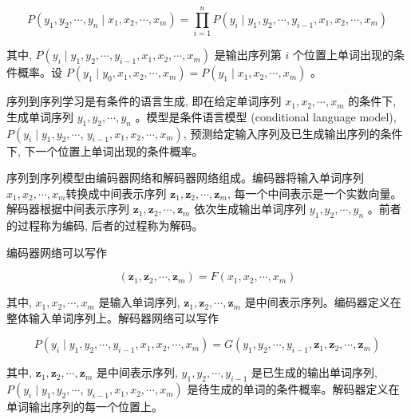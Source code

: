 \documentclass[10pt]{article}
\begin{document}
\begin{equation*}
P\left(y_{1}, y_{2}, \cdots, y_{n} \mid x_{1}, x_{2}, \cdots, x_{m}\right)=\prod_{i=1}^{n} P\left(y_{i} \mid y_{1}, y_{2}, \cdots, y_{i-1}, x_{1}, x_{2}, \cdots, x_{m}\right) \tag{26.1}
\end{equation*}


其中, $P\left(y_{i} \mid y_{1}, y_{2}, \cdots, y_{i-1}, x_{1}, x_{2}, \cdots, x_{m}\right)$ 是输出序列第 $i$ 个位置上单词出现的条件概率。设 $P\left(y_{1} \mid y_{0}, x_{1}, x_{2}, \cdots, x_{m}\right)=P\left(y_{1} \mid x_{1}, x_{2}, \cdots, x_{m}\right)$ 。

序列到序列学习是有条件的语言生成, 即在给定单词序列 $x_{1}, x_{2}, \cdots, x_{m}$ 的条件下, 生成单词序列 $y_{1}, y_{2}, \cdots, y_{n}$ 。模型是条件语言模型 (conditional language model), $P\left(y_{i} \mid y_{1}, y_{2}, \cdots\right.$, $\left.y_{i-1}, x_{1}, x_{2}, \cdots, x_{m}\right)$, 预测给定输入序列及已生成输出序列的条件下, 下一个位置上单词出现的条件概率。

序列到序列模型由编码器网络和解码器网络组成。编码器将输入单词序列 $x_{1}, x_{2}, \cdots, x_{m}$转换成中间表示序列 $\boldsymbol{z}_{1}, \boldsymbol{z}_{2}, \cdots, \boldsymbol{z}_{m}$, 每一个中间表示是一个实数向量。解码器根据中间表示序列 $\boldsymbol{z}_{1}, \boldsymbol{z}_{2}, \cdots, \boldsymbol{z}_{m}$ 依次生成输出单词序列 $y_{1}, y_{2}, \cdots, y_{n}$ 。前者的过程称为编码, 后者的过程称为解码。

编码器网络可以写作


\begin{equation*}
\left(\boldsymbol{z}_{1}, \boldsymbol{z}_{2}, \cdots, \boldsymbol{z}_{m}\right)=F\left(x_{1}, x_{2}, \cdots, x_{m}\right) \tag{26.2}
\end{equation*}


其中, $x_{1}, x_{2}, \cdots, x_{m}$ 是输入单词序列, $\boldsymbol{z}_{1}, \boldsymbol{z}_{2}, \cdots, \boldsymbol{z}_{m}$ 是中间表示序列。编码器定义在整体输入单词序列上。解码器网络可以写作


\begin{equation*}
P\left(y_{i} \mid y_{1}, y_{2}, \cdots, y_{i-1}, x_{1}, x_{2}, \cdots, x_{m}\right)=G\left(y_{1}, y_{2}, \cdots, y_{i-1}, \boldsymbol{z}_{1}, \boldsymbol{z}_{2}, \cdots, \boldsymbol{z}_{m}\right) \tag{26.3}
\end{equation*}


其中, $\boldsymbol{z}_{1}, \boldsymbol{z}_{2}, \cdots, \boldsymbol{z}_{m}$ 是中间表示序列, $y_{1}, y_{2}, \cdots, y_{i-1}$ 是已生成的输出单词序列, $P\left(y_{i} \mid y_{1}, y_{2}, \cdots\right.$, $\left.y_{i-1}, x_{1}, x_{2}, \cdots, x_{m}\right)$ 是待生成的单词的条件概率。解码器定义在单词输出序列的每一个位置上。
\end{document}
